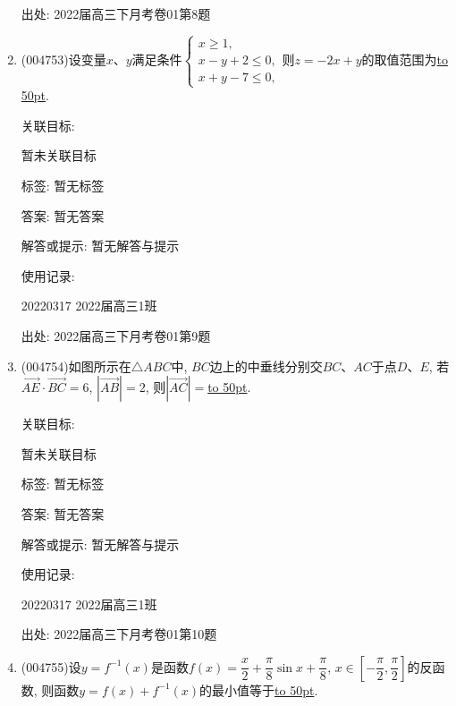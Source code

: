 \documentclass[10pt,a4paper]{article}
\newcommand{\blank}[1]{\underline{\hbox to #1pt{}}}
\begin{document}
\begin{enumerate}[1.]
出处: 2022届高三下月考卷01第8题
\item { (004753)}设变量$x$、$y$满足条件$\begin{cases} x\ge 1,\\ x-y+2\le 0,\\ x+y-7\le 0, \end{cases}$则$z=-2x+y$的取值范围为\blank{50}.


关联目标:

暂未关联目标



标签: 暂无标签

答案: 暂无答案

解答或提示: 暂无解答与提示

使用记录:

20220317	2022届高三1班	


出处: 2022届高三下月考卷01第9题
\item { (004754)}如图所示在$\triangle ABC$中, $BC$边上的中垂线分别交$BC$、$AC$于点$D$、$E$, 若$\overrightarrow{AE}\cdot \overrightarrow{BC}=6$, $|\overrightarrow{AB}|=2$, 则$|\overrightarrow{AC}|=$\blank{50}.
\begin{center}
\end{center}


关联目标:

暂未关联目标



标签: 暂无标签

答案: 暂无答案

解答或提示: 暂无解答与提示

使用记录:

20220317	2022届高三1班	


出处: 2022届高三下月考卷01第10题
\item { (004755)}设$y=f^{-1}(x)$是函数$f(x)=\dfrac x2+\dfrac{\pi}8\sin x+\dfrac{\pi}8$, $x\in [-\dfrac{\pi }2,\dfrac{\pi }2]$的反函数, 则函数$y=f(x)+f^{-1}(x)$的最小值等于\blank{50}.



\end{enumerate}
\end{document}
